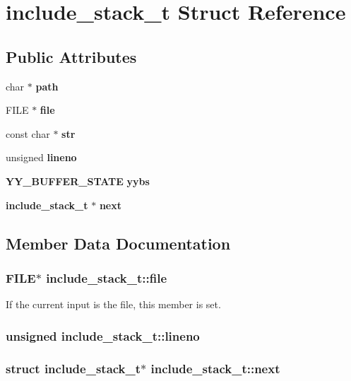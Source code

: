 \section{include\_\-stack\_\-t Struct Reference}
\label{structinclude__stack__t}
\subsection*{Public Attributes}
\begin{CompactItemize}
\item 
char $\ast$ {\bf path}
\item 
FILE $\ast$ {\bf file}
\item 
const char $\ast$ {\bf str}
\item 
unsigned {\bf lineno}
\item 
{\bf YY\_\-BUFFER\_\-STATE} {\bf yybs}
\item 
{\bf include\_\-stack\_\-t} $\ast$ {\bf next}
\end{CompactItemize}


\subsection{Member Data Documentation}
\subsubsection{\setlength{\rightskip}{0pt plus 5cm}FILE$\ast$ {\bf include\_\-stack\_\-t::file}}\label{structinclude__stack__t_o1}


If the current input is the file, this member is set. 
\subsubsection{\setlength{\rightskip}{0pt plus 5cm}unsigned {\bf include\_\-stack\_\-t::lineno}}\label{structinclude__stack__t_o3}


\subsubsection{\setlength{\rightskip}{0pt plus 5cm}struct {\bf include\_\-stack\_\-t}$\ast$ {\bf include\_\-stack\_\-t::next}}\label{structinclude__stack__t_o5}


